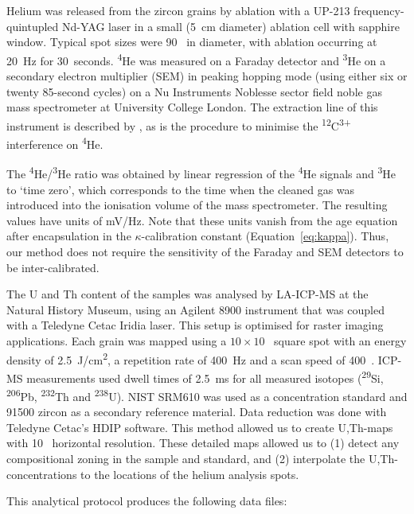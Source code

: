\documentclass{article}
\begin{document}
Helium was released from the zircon grains by ablation with a UP-213
frequency-quintupled Nd-YAG laser in a small (5~cm diameter) ablation
cell with sapphire window. Typical spot sizes were 90~ in
diameter, with ablation occurring at 20~Hz for
30~seconds. \textsuperscript{4}He was measured on a Faraday detector
and \textsuperscript{3}He on a secondary electron multiplier (SEM) in
peaking hopping mode (using either six or twenty 85-second cycles) on
a Nu Instruments Noblesse sector field noble gas mass spectrometer at
University College London. The extraction line of this instrument is
described by \citet{schwanethal2015}, as is the procedure to minimise
the \textsuperscript{12}C\textsuperscript{3+} interference on
\textsuperscript{4}He.\medskip

The \textsuperscript{4}He/\textsuperscript{3}He ratio was obtained by
linear regression of the \textsuperscript{4}He signals and
\textsuperscript{3}He to `time zero', which corresponds to the time
when the cleaned gas was introduced into the ionisation volume of the
mass spectrometer.  The resulting values have units of mV/Hz. Note
that these units vanish from the age equation after encapsulation in
the $\kappa$-calibration constant (Equation~\ref{eq:kappa}). Thus, our
method does not require the sensitivity of the Faraday and SEM
detectors to be inter-calibrated.\medskip

The U and Th content of the samples was analysed by LA-ICP-MS at the
Natural History Museum, using an Agilent 8900 instrument that was
coupled with a Teledyne Cetac Iridia laser. This setup is optimised
for raster imaging applications. Each grain was mapped using a
${10}\times{10}$~ square spot with an energy density of
2.5~J/cm\textsuperscript{2}, a repetition rate of 400~Hz and a scan
speed of 400~. ICP-MS measurements used dwell times of
2.5~ms for all measured isotopes (\textsuperscript{29}Si,
\textsuperscript{206}Pb, \textsuperscript{232}Th and
\textsuperscript{238}U). NIST SRM610 was used as a concentration
standard and 91500 zircon as a secondary reference material. Data
reduction was done with Teledyne Cetac's HDIP software. This method
allowed us to create U,Th-maps with 10~ horizontal
resolution. These detailed maps allowed us to (1) detect any
compositional zoning in the sample and standard, and (2) interpolate
the U,Th-concentrations to the locations of the helium analysis spots.
\medskip

This analytical protocol produces the following data files:
\end{document}
